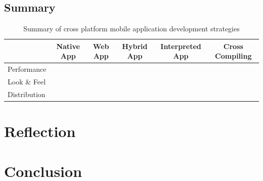 \subsection{Summary}

\begin{table}
    \begin{center}
        \begin{tabular}{l|c|c|c|c|c}
                         & Native App & Web App & Hybrid App & Interpreted App & Cross Compiling\\\hline
            Performance  &            &         &            &                 &                \\
            Look \& Feel &            &         &            &                 &                \\
            Distribution &            &         &            &                 &                \\
        \end{tabular}
		\caption{
			Summary of cross platform mobile application development strategies
		}
		\label{tab:architectures}
    \end{center}
\end{table}

\npar

\section{Reflection}

\section{Conclusion}